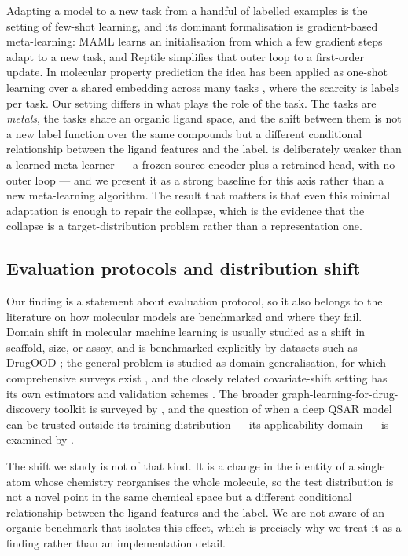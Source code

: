 Adapting a model to a new task from a handful of labelled examples is the
setting of few-shot learning, and its dominant formalisation is
gradient-based meta-learning: MAML \citep{maml2017} learns an initialisation
from which a few gradient steps adapt to a new task, and Reptile
\citep{reptile2018} simplifies that outer loop to a first-order update. In
molecular property prediction the idea has been applied as one-shot learning
over a shared embedding across many tasks \citep{oneshotdrug2017}, where the
scarcity is labels per task. Our setting differs in what plays the role of the
task. The tasks are \emph{metals}, the tasks share an organic ligand space, and
the shift between them is not a new label function over the same compounds but a
different conditional relationship between the ligand features and the label.
\fsma{} is deliberately weaker than a learned meta-learner --- a frozen source
encoder plus a retrained head, with no outer loop --- and we present it as a
strong baseline for this axis rather than a new meta-learning algorithm. The
result that matters is that even this minimal adaptation is enough to repair the
collapse, which is the evidence that the collapse is a target-distribution
problem rather than a representation one.

\subsection{Evaluation protocols and distribution shift}
\label{sec:related:shift}

Our finding is a statement about evaluation protocol, so it also belongs to the
literature on how molecular models are benchmarked and where they fail. Domain
shift in molecular machine learning is usually studied as a shift in scaffold,
size, or assay, and is benchmarked explicitly by datasets such as DrugOOD
\citep{drugood2023}; the general problem is studied as domain generalisation,
for which comprehensive surveys exist \citep{zhoudg2023,wangdg2021}, and the
closely related covariate-shift setting has its own estimators and validation
schemes \citep{sugiyama2006}. The broader
graph-learning-for-drug-discovery toolkit is surveyed by \citet{gnn2025review},
and the question of when a deep QSAR model can be trusted outside its training
distribution --- its applicability domain --- is examined by
\citet{applicabilitydomain2019}.

The shift we study is not of that kind. It is a change in the identity of a
single atom whose chemistry reorganises the whole molecule, so the test
distribution is not a novel point in the same chemical space but a different
conditional relationship between the ligand features and the label. We are not
aware of an organic benchmark that isolates this effect, which is precisely why
we treat it as a finding rather than an implementation detail.

